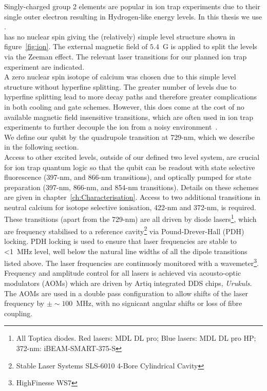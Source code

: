     Singly-charged group 2 elements are popular in ion trap
    experiments due to their single outer electron resulting in Hydrogen-like
    energy levels. In this thesis we use \ca.\\
    \ca has
    no nuclear spin giving the
    (relatively) simple level structure shown in figure~\ref{fig:ion}. The external
    magnetic field of $5.4$~G is applied to split the levels via the Zeeman
    effect. The relevant laser transitions for our planned ion trap
    experiment are indicated.\\
    A zero nuclear spin isotope of calcium was chosen due to this simple level
    structure without hyperfine splitting. The greater number of levels due to
    hyperfine splitting lead to more decay paths and therefore greater
    complications in both cooling and gate schemes. However, this does come at
    the cost of no available magnetic field insensitive transitions, which are
    often used in ion trap experiments to further decouple the ion from a noisy
    environment~\cite{}. \\
    We define our qubit by the quadrupole transition at 729-nm, which we describe in the following section.\\
    Access to other excited levels, outside of our defined two level system, are crucial for ion trap quantum logic so that the qubit can be readout with state selective fluorescence (397-nm, and 866-nm transitions), and optically pumped for state preparation (397-nm, 866-nm, and 854-nm transitions). Details on these schemes are given in chapter~\ref{ch:Characterisation}. Access to two additional transitions in neutral calcium for isotope selective ionisation, 422-nm and 372-nm, is required.\\
    These transitions (apart from the 729-nm) are all driven by diode lasers\footnote{All Toptica diodes. Red lasers: MDL DL pro; Blue lasers: MDL DL pro HP; 372-nm: iBEAM-SMART-375-S}, which are frequency stabilised to a reference cavity\footnote{Stable Laser Systems SLS-6010 4-Bore Cylindrical Cavity} via Pound-Drever-Hall (PDH) locking. PDH locking is used to ensure that laser frequencies are stable to <1~MHz level, well below the natural line widths of all the dipole transitions listed above. The laser frequencies are continuosly monitored with a wavemeter\footnote{HighFinesse WS7}.\\
    Frequency and amplitude control for all lasers is achieved via acousto-optic modulators (AOMs) which are driven by Artiq integrated DDS chips, \emph{Urukuls}. The AOMs are used in a double pass configuration to allow shifts of the laser frequency by $\pm \sim 100$~MHz, with no signicant angular shifts or loss of fibre coupling. 
    

